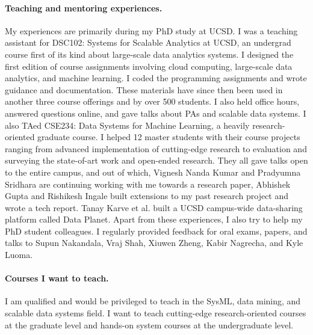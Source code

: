 \documentclass[letterpaper]{article}
\begin{document}
\paragraph{Teaching and mentoring experiences.} My experiences are primarily during my PhD study at UCSD. I was a teaching assistant for DSC102: Systems for Scalable Analytics at UCSD, an undergrad course first of its kind about large-scale data analytics systems. I designed the first edition of course assignments involving cloud computing, large-scale data analytics, and machine learning. I coded the programming assignments and wrote guidance and documentation. These materials have since then been used in another three course offerings and by over 500 students. I also held office hours, answered questions online, and gave talks about PAs and scalable data systems. I also TAed CSE234: Data Systems for Machine Learning, a heavily research-oriented graduate course. I helped 12 master students with their course projects ranging from advanced implementation of cutting-edge research to evaluation and surveying the state-of-art work and open-ended research. They all gave talks open to the entire campus, and out of which, Vignesh Nanda Kumar and Pradyumna Sridhara are continuing working with me towards a research paper, Abhishek Gupta and Rishikesh Ingale built extensions to my past research project and wrote a tech report. Tanay Karve et al. built a UCSD campus-wide data-sharing platform called Data Planet. Apart from these experiences, I also try to help my PhD student colleagues. I regularly provided feedback for oral exams, papers, and talks to Supun Nakandala, Vraj Shah, Xiuwen Zheng, Kabir Nagrecha, and Kyle Luoma.

\paragraph{Courses I want to teach.} I am qualified and would be privileged to teach in the SysML, data mining, and scalable data systems field. I want to teach cutting-edge research-oriented courses at the graduate level and hands-on system courses at the undergraduate level. 



%
%
\end{document}

